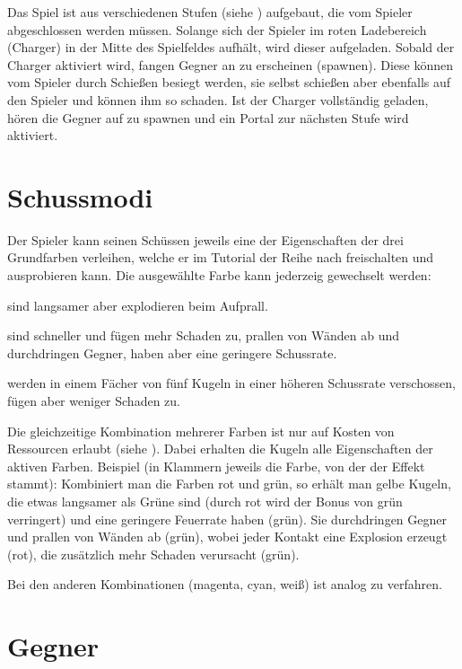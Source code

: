 \documentclass[a4paper,10pt,ngerman,fontsize=12pt]{scrreprt}
\begin{document}
Das Spiel ist aus verschiedenen Stufen (siehe ) aufgebaut, die vom Spieler abgeschlossen werden müssen.
Solange sich der Spieler im roten Ladebereich (Charger) in der Mitte des Spielfeldes aufhält, wird dieser aufgeladen.
Sobald der Charger aktiviert wird, fangen Gegner an zu erscheinen (spawnen). Diese können vom Spieler durch Schie{\ss}en besiegt werden, sie selbst schie{\ss}en aber ebenfalls auf den Spieler und können ihm so schaden.
Ist der Charger vollständig geladen, hören die Gegner auf zu spawnen und ein Portal zur nächsten Stufe wird aktiviert.




\section{Schussmodi}

Der Spieler kann seinen Schüssen jeweils eine der Eigenschaften der drei Grundfarben verleihen, welche er im Tutorial der Reihe nach freischalten und ausprobieren kann. Die ausgewählte Farbe kann jederzeig gewechselt werden:

\renewcommand{\itmspace}{4.5em}
{sind langsamer aber explodieren beim Aufprall.}

{sind schneller und fügen mehr Schaden zu, prallen von Wänden ab und durchdringen Gegner, haben aber eine geringere Schussrate.}

{werden in einem Fächer von fünf Kugeln in einer höheren Schussrate verschossen, fügen aber weniger Schaden zu.}

Die gleichzeitige Kombination mehrerer Farben ist nur auf Kosten von Ressourcen erlaubt  (siehe ). Dabei erhalten die Kugeln alle Eigenschaften der aktiven Farben.
Beispiel (in Klammern jeweils die Farbe, von der der Effekt stammt): Kombiniert man die Farben rot und grün, so erhält man gelbe Kugeln, die etwas langsamer als Grüne sind (durch rot wird der Bonus von grün verringert) und eine geringere Feuerrate haben (grün). Sie durchdringen Gegner und prallen von Wänden ab (grün), wobei jeder Kontakt eine Explosion erzeugt (rot), die zusätzlich mehr Schaden verursacht (grün).

Bei den anderen Kombinationen (magenta, cyan, wei{\ss}) ist analog zu verfahren.


\section{Gegner}
\end{document}
